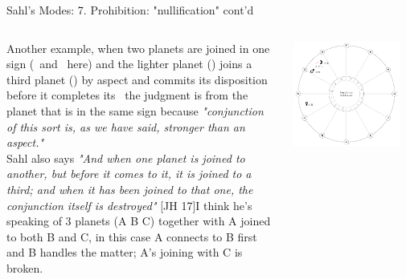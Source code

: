 \begin{frame}[t]{Sahl's Modes: 7. Prohibition: "nullification" cont'd}
\begin{columns}[T, onlytextwidth]
Another example, when two planets are joined in one sign (\Moon\ and \Mars\ here) and the lighter planet (\Moon) joins a third planet (\Venus) by aspect and commits its disposition before it completes its \Conjunction\, the judgment is from the planet that is in the same sign because \textsl{"conjunction of this sort is, as we have said, stronger than an aspect."} \\

\vspace{0.2cm}
Sahl also says \textsl{"And when one planet is joined to another, but before it comes to it, it is joined to a third; and when it has been joined to that one, the conjunction itself is destroyed"} [JH 17]\footnotemark[1] I think he's speaking of 3 planets (A B C) together with A joined to both B and C, in this case A connects to B first and B handles the matter; A's joining with C is broken.

\begin{center}
{\includegraphics[width=0.9\textwidth]{charts/64a-nullification}} \\
\end{center}
\end{columns}
\end{frame}
